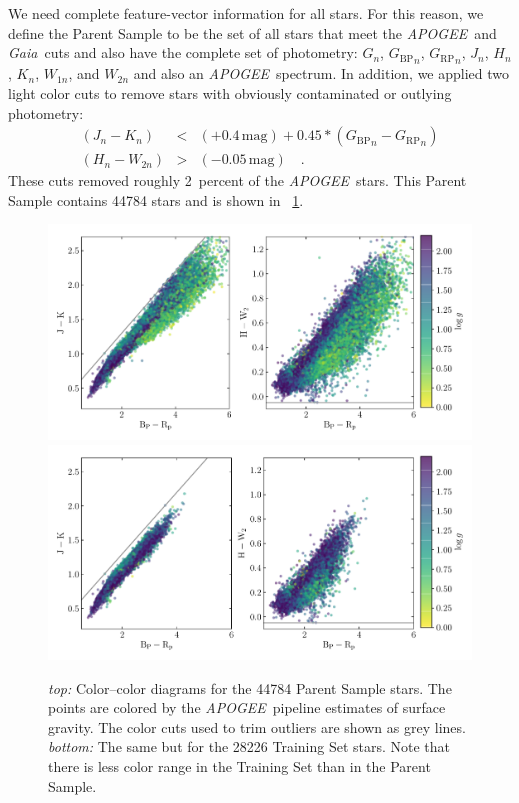 \documentclass[modern]{aastex62}
\newcommand{\acronym}[1]{{\small{#1}}}
\newcommand{\project}[1]{\textsl{#1}}
\newcommand{\apogee}{\project{\acronym{APOGEE}}}
\newcommand{\gaia}{\project{Gaia}}
\newcommand{\BP}{{G_\mathrm{BP}}}
\newcommand{\RP}{{G_\mathrm{RP}}}
\begin{document}
We need complete feature-vector information for all stars.  For this
reason, we define the Parent Sample to be the set of all stars that
meet the \apogee\ and \gaia\ cuts and also
have the complete set of photometry: $G_n$, $\BP_n$, $\RP_n$, $J_n$,
$H_n$, $K_n$, $W_{1n}$, and $W_{2n}$ and also an \apogee\ spectrum.
In addition, we applied two light color cuts to remove stars with obviously
contaminated or outlying photometry:
\begin{eqnarray}
(J_n - K_n) &<& (+0.4\,\mathrm{mag}) + 0.45 * (\BP_n - \RP_n)
\\
(H_n - W_{2n}) &>& (-0.05\,\mathrm{mag})
\quad .
\end{eqnarray}
These cuts removed roughly 2~percent of the \apogee\ stars.
This Parent Sample contains 44784 stars and is shown in \figurename~\ref{fig:samples}.
\begin{figure}
\includegraphics[width=\textwidth]{./parent_sample.pdf}\\
\includegraphics[width=\textwidth]{./training_sample.pdf}
\caption{\textsl{top:}
  Color--color diagrams for the 44784 Parent Sample stars.
  The points are colored by
  the \apogee\ pipeline estimates of surface gravity.
  The color cuts used to trim outliers are shown as grey lines.
  \textsl{bottom:}
  The same but for the 28226 Training Set stars.
  Note that there is less color range in the Training Set than in the
  Parent Sample.\label{fig:samples}}
\end{figure}
\end{document}
